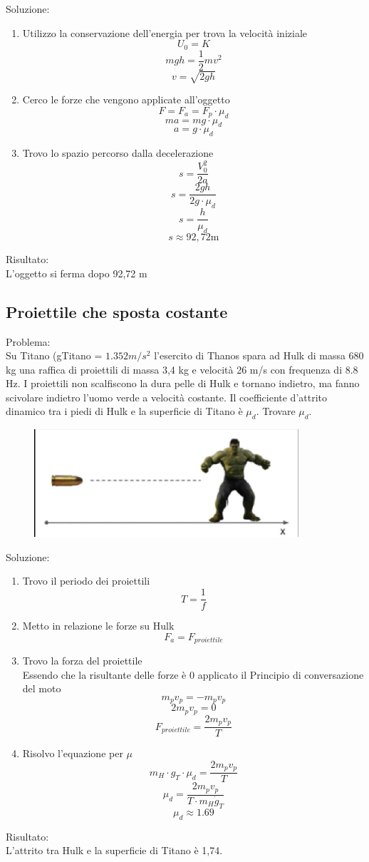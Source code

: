 \documentclass{article}
\begin{document}
\noindent Soluzione:
\begin{enumerate}
    \item Utilizzo la conservazione dell'energia per trova la velocità iniziale
    \[U_0 = K\]
    \[mgh = \frac{1}{2}mv^2\]
    \[ v = \sqrt{2gh}\]
    \item Cerco le forze che vengono applicate all'oggetto
    \[ F = F_a = F_p\cdot \mu_d\]
    \[ ma = mg\cdot \mu_d\]
    \[ a = g\cdot \mu_d\]
    \item Trovo lo spazio percorso dalla decelerazione
    \[ s=\frac{V_0^2}{2a}\]
    \[ s = \frac{2gh}{2g\cdot \mu_d}\]
    \[ s = \frac{h}{\mu_d}\]
    \[ s \approx 92,72 \text{m}\]
\end{enumerate}

\noindent Risultato:\\
L'oggetto si ferma dopo 92,72 m
\newpage
\subsection{Proiettile che sposta costante}
Problema:\\
Su Titano (gTitano = \(1.352 m/s^2\) l'esercito di Thanos spara ad Hulk di massa 680 kg una raffica di proiettili di massa 3,4 kg e velocità 26 m/s con frequenza di 8.8 Hz. I proiettili non scalfiscono la dura pelle di Hulk e tornano indietro, ma fanno scivolare indietro l'uomo verde a velocità costante. Il coefficiente d'attrito dinamico tra i piedi di Hulk e la superficie di Titano è \(\mu_d\). Trovare \(\mu_d\).
\begin{figure}[ht]
    \centering
    \includegraphics[width=0.5\linewidth]{Immagini/Hulkscivola.png}
\end{figure}

\noindent Soluzione:
\begin{enumerate}
    \item Trovo il periodo dei proiettili
    \[T = \frac{1}{f}\]
    \item Metto in relazione le forze su Hulk
    \[ F_a = F_{proiettile}\]
    \item Trovo la forza del proiettile\\
    Essendo che la risultante delle forze è 0 applicato il Principio di conversazione del moto
    \[m_{p}v_p = - m_pv_p\]
    \[2m_pv_p = 0\]
    \[F_{proiettile} = \frac{2m_pv_p}{T}\]
    \item Risolvo l'equazione per \(\mu\)
    \[m_H \cdot g_T \cdot \mu_d = \frac{2m_pv_p}{T}\]
    \[\mu_d = \frac{2m_pv_p}{T \cdot m_H \dot g_T}\]
    \[\mu_d \approx 1.69\]
\end{enumerate}

\noindent Risultato:\\
L'attrito tra Hulk e la superficie di Titano è 1,74.
\end{document}
